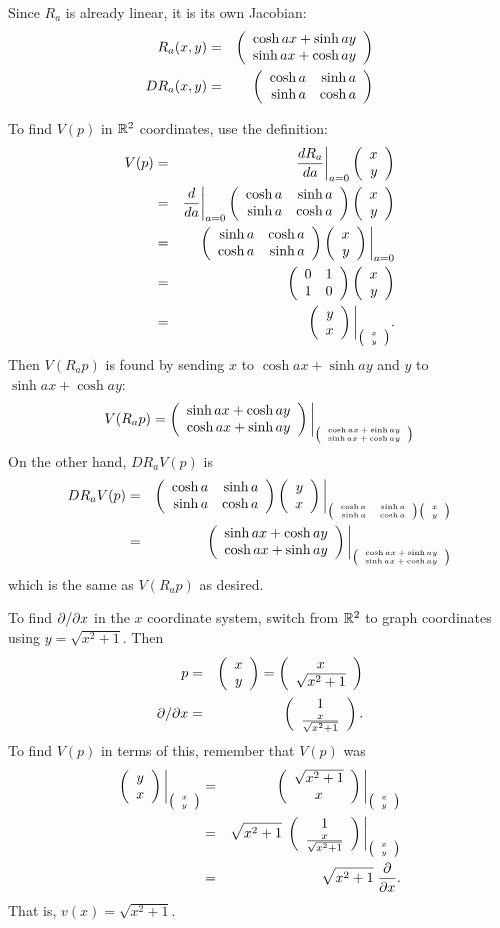 \documentclass[10pt]{article}
\numberwithin{equation}{subsection}
\begin{document}
Since $R_a$ is already linear, it is its own Jacobian:
\begin{eqnarray*}
	R_a(x,y)  &=& \colvectwo{\cosh a x + \sinh a y}{\sinh a x + \cosh a y} \\
	DR_a(x,y) &=& \prmatrix{\cosh a & \sinh a \\ \sinh a & \cosh a}
\end{eqnarray*}

To find $V(p)$ in $\R^2$ coordinates, use the definition:
\begin{eqnarray*}
	V(p) &=& \frac{dR_a}{da}\pickpipe{a=0}\colvectwo{x}{y} \\
	&=& \frac{d}{da}\pickpipe{a=0}
		\prmatrix{\cosh a & \sinh a \\ \sinh a & \cosh a}
		\colvectwo{x}{y} \\
	&=& \prmatrix{\sinh a & \cosh a \\ \cosh a & \sinh a}
		\colvectwo{x}{y} \pickpipe{a=0} \\
	&=& \prmatrix{0 & 1 \\ 1 & 0}
		\colvectwo{x}{y} \\
	&=& \colvectwo{y}{x}\pickpipe{\colvectwo{x}{y}}.
\end{eqnarray*}
Then $V(R_a p)$ is found by sending $x$ to $\cosh a x + \sinh a y$
and $y$ to $\sinh a x + \cosh a y$:
$$
	V(R_a p) =
	\colvectwo{\sinh a x + \cosh a y}{\cosh a x + \sinh a y}
		\pickpipe
	{\colvectwo{\cosh a x + \sinh a y}{\sinh a x + \cosh a y}}
$$
On the other hand, $DR_a V(p)$ is
\begin{eqnarray*}
	DR_a V(p) &=& \prmatrix{\cosh a & \sinh a \\ \sinh a & \cosh a}
		\colvectwo{y}{x}
			\pickpipe{
			\prmatrix{\cosh a & \sinh a \\ \sinh a & \cosh a}
			\colvectwo{x}{y}} \\
	&=& \colvectwo{\sinh a x + \cosh a y}{\cosh a x + \sinh a y}
			\pickpipe{
			\colvectwo{\cosh a x + \sinh a y}{\sinh a x + \cosh a y}}
\end{eqnarray*}
which is the same as $V(R_a p)$ as desired.

To find $\slashDx$ in the $x$ coordinate system, switch from $\R^2$
to graph coordinates using $y=\sqrt{x^2+1}$.  Then
\begin{eqnarray*}
	p &=& \colvectwo{x}{y} = \colcvectwo{x}{\sqrt{x^2+1}} \\
	\slashDx &=& \colcvectwo{1}{\frac{x}{\sqrt{x^2+1}}}.
\end{eqnarray*}
To find $V(p)$ in terms of this, remember that $V(p)$ was
\begin{eqnarray*}
	\colcvectwo{y}{x}\pickpipe{\colcvectwo{x}{y}}
	&=& \colcvectwo{\sqrt{x^2+1}}{x}\pickpipe{\colcvectwo{x}{y}} \\
	&=& \sqrt{x^2+1}\; \colcvectwo{1}{\frac{x}{\sqrt{x^2+1}}}
		\pickpipe{\colcvectwo{x}{y}} \\
	&=& \sqrt{x^2+1}\;\fracDx.
\end{eqnarray*}
That is, $v(x) = \sqrt{x^2+1}$.
\end{document}
